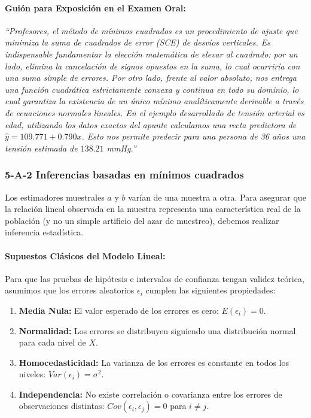 \documentclass[11pt,letterpaper]{article}
\begin{document}
\paragraph{Guión para Exposición en el Examen Oral:}
\begin{tcolorbox}[colback=lightCream, colframe=primaryBlue, arc=4pt]
\fontsize{10}{12}\selectfont
\textit{``Profesores, el método de mínimos cuadrados es un procedimiento de ajuste que minimiza la suma de cuadrados de error (SCE) de desvíos verticales. Es indispensable fundamentar la elección matemática de elevar al cuadrado: por un lado, elimina la cancelación de signos opuestos en la suma, lo cual ocurriría con una suma simple de errores. Por otro lado, frente al valor absoluto, nos entrega una función cuadrática estrictamente convexa y continua en todo su dominio, lo cual garantiza la existencia de un único mínimo analíticamente derivable a través de ecuaciones normales lineales. En el ejemplo desarrollado de tensión arterial vs edad, utilizando los datos exactos del apunte calculamos una recta predictora de $\hat{y} = 109.771 + 0.790x$. Esto nos permite predecir para una persona de 36 años una tensión estimada de $138.21$ mmHg.''}
\end{tcolorbox}

\newpage

\subsubsection{5-A-2 Inferencias basadas en mínimos cuadrados}
Los estimadores muestrales $a$ y $b$ varían de una muestra a otra. Para asegurar que la relación lineal observada en la muestra representa una característica real de la población (y no un simple artificio del azar de muestreo), debemos realizar inferencia estadística.

\paragraph{Supuestos Clásicos del Modelo Lineal:}
Para que las pruebas de hipótesis e intervalos de confianza tengan validez teórica, asumimos que los errores aleatorios $\epsilon_i$ cumplen las siguientes propiedades:
\begin{enumerate}
    \item \textbf{Media Nula:} El valor esperado de los errores es cero: $E(\epsilon_i) = 0$.
    \item \textbf{Normalidad:} Los errores se distribuyen siguiendo una distribución normal para cada nivel de $X$.
    \item \textbf{Homocedasticidad:} La varianza de los errores es constante en todos los niveles: $Var(\epsilon_i) = \sigma^2$.
    \item \textbf{Independencia:} No existe correlación o covarianza entre los errores de observaciones distintas: $Cov(\epsilon_i, \epsilon_j) = 0$ para $i \neq j$.
\end{enumerate}
\end{document}

